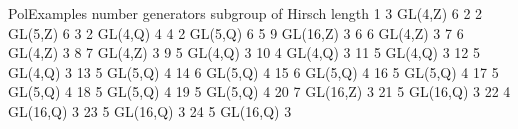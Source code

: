 \begintt
PolExamples      number generators      subgroup of      Hirsch length
          1                      3           GL(4,Z)                 6 
          2                      2           GL(5,Z)                 6 
          3                      2           GL(4,Q)                 4 
          4                      2           GL(5,Q)                 6 
          5                      9          GL(16,Z)                 3 
          6                      6           GL(4,Z)                 3
          7                      6           GL(4,Z)                 3
          8                      7           GL(4,Z)                 3 
          9                      5           GL(4,Q)                 3
         10                      4           GL(4,Q)                 3 
         11                      5           GL(4,Q)                 3
         12                      5           GL(4,Q)                 3 
         13                      5           GL(5,Q)                 4
         14                      6           GL(5,Q)                 4 
         15                      6           GL(5,Q)                 4 
         16                      5           GL(5,Q)                 4
         17                      5           GL(5,Q)                 4 
         18                      5           GL(5,Q)                 4
         19                      5           GL(5,Q)                 4 
         20                      7          GL(16,Z)                 3 
         21                      5          GL(16,Q)                 3 
         22                      4          GL(16,Q)                 3
         23                      5          GL(16,Q)                 3 
         24                      5          GL(16,Q)                 3 

\endtt





